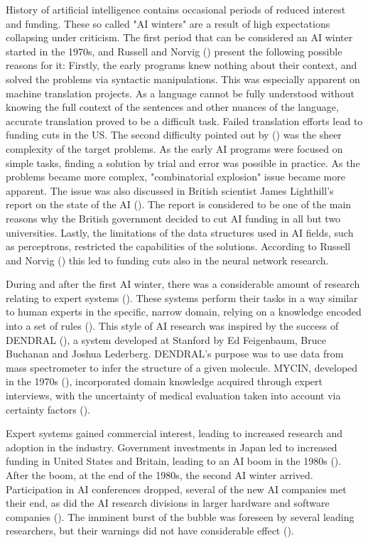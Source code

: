 History of artificial intelligence contains occasional periods of reduced
interest and funding. These so called "AI winters" are a result of high
expectations collapsing under criticism. The first period that can be considered
an AI winter started in the 1970s, and Russell and Norvig (\cite*{norvig2002})
present the following possible reasons for it: Firstly, the early programs knew
nothing about their context, and solved the problems via syntactic
manipulations. This was especially apparent on machine translation projects. As
a language cannot be fully understood without knowing the full context of the
sentences and other nuances of the language, accurate translation proved to be a
difficult task. Failed translation efforts lead to funding cuts in the US. The
second difficulty pointed out by (\cite{norvig2002}) was the sheer complexity of
the target problems. As the early AI programs were focused on simple tasks,
finding a solution by trial and error was possible in practice. As the problems
became more complex, "combinatorial explosion" issue became more apparent. The
issue was also discussed in British scientist James Lighthill's report on the
state of the AI (\cite*{lighthill1973}). The report is considered to be one of
the main reasons why the British government decided to cut AI funding in all but
two universities. Lastly, the limitations of the data structures used in AI
fields, such as perceptrons, restricted the capabilities of the solutions.
According to Russell and Norvig (\cite*{norvig2002}) this led to funding cuts
also in the neural network research.

During and after the first AI winter, there was a considerable amount of
research relating to expert systems (\cite{norvig2002}). These systems perform
their tasks in a way similar to human experts in the specific, narrow domain,
relying on a knowledge encoded into a set of rules (\cite{myers1986}). This
style of AI research was inspired by the success of DENDRAL
(\cite{buchanan1968}), a system developed at Stanford by Ed Feigenbaum, Bruce
Buchanan and Joshua Lederberg. DENDRAL's purpose was to use data from mass
spectrometer to infer the structure of a given molecule. MYCIN, developed in the
1970s (\cite{shortliffe1975}), incorporated domain knowledge acquired through
expert interviews, with the uncertainty of medical evaluation taken into account
via certainty factors (\cite{norvig2002}).

Expert systems gained commercial interest, leading to increased research and
adoption in the industry. Government investments in Japan led to increased
funding in United States and Britain, leading to an AI boom in the 1980s
(\cite{norvig2002}). After the boom, at the end of the 1980s, the second AI
winter arrived. Participation in AI conferences dropped, several of the new AI
companies met their end, as did the AI research divisions in larger hardware and
software companies (\cite{nilsson2009}). The imminent burst of the bubble was
foreseen by several leading researchers, but their warnings did not have
considerable effect (\cite{nilsson2009}).

